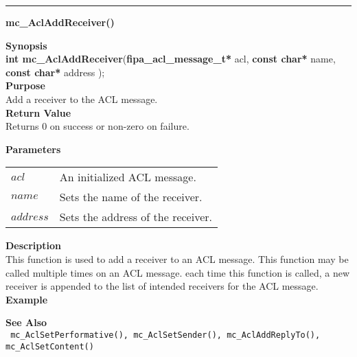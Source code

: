 \noindent
\vspace{5pt}
\rule{6.5in}{0.015in}
\noindent
{}
{\LARGE \bf mc\_AclAddReceiver()}\\
\label{api:mc_AclAddReceiver()}

\noindent
{\bf Synopsis}\\
{\bf int mc\_AclAddReceiver}({\bf fipa\_acl\_message\_t*} acl, {\bf const char*} name, {\bf const char*} address );\\

\noindent
{\bf Purpose}\\
Add a receiver to the ACL message.\\

\noindent
{\bf Return Value}\\
Returns 0 on success or non-zero on failure.

\noindent
{\bf Parameters}
\vspace{-0.1in}
\begin{description}
\item
\begin{tabular}{p{10 mm}p{145 mm}} 
$acl$ & An initialized ACL message. \\
$name$ & Sets the name of the receiver. \\
$address$ & Sets the address of the receiver. 
\end{tabular}
\end{description}

\noindent
{\bf Description}\\
This function is used to add a receiver to an ACL message. This function 
may be called multiple times on an ACL message. each time this function is 
called, a new receiver is appended to the list of intended receivers
for the ACL message. \\

\noindent
{\bf Example}\\
\noindent
{\footnotesize}

\noindent
{\bf See Also}\\
\texttt{
  mc\_AclSetPerformative(), mc\_AclSetSender(), mc\_AclAddReplyTo(), 
    \linebreak mc\_AclSetContent()
}

